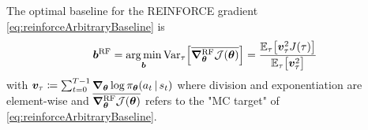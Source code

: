 			\begin{theorem}
				The optimal baseline for the REINFORCE gradient \eqref{eq:reinforceArbitraryBaseline} is
				\begin{equation}
					\bm{b}^\mathrm{RF}
						= \operatorname*{arg\,min}_{\bm{b}} \operatorname{Var}_\tau\Bigl[ \overline{\grad_{\bm{\theta}}^\mathrm{RF} \mathcal{J}(\bm{\theta})} \Bigr]
						= \frac{\mathbb{E}_\tau\bigl[ \bm{v}_\tau^2 J(\tau) \bigr]}{\mathbb{E}_\tau\bigl[ \bm{v}_\tau^2 \bigr]}
					\label{eq:reinforceOptimalBaseline}
				\end{equation}
				with \( \bm{v}_\tau \coloneqq  \sum_{t = 0}^{T - 1} \grad_{\bm{\theta}} \log \pi_{\bm{\theta}}(a_t \,\vert\, s_t) \) where division and exponentiation are element-wise and \( \overline{\grad_{\bm{\theta}}^\mathrm{RF} \mathcal{J}(\bm{\theta})} \) refers to the "\ac{MC} target" of \eqref{eq:reinforceArbitraryBaseline}.
			\end{theorem}
